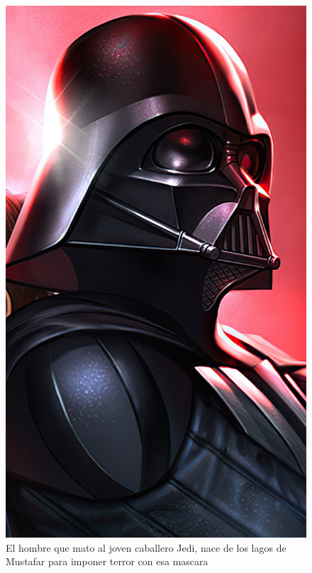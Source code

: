 \documentclass[11pt, a5paper]{article}
\begin{document}
\begin{figure}
\includegraphics[scale=0.07, angle=-18]{darth-vader-star-wars-6875.jpg}
\caption*{El hombre que mato al joven caballero Jedi, nace de los lagos de Mustafar para imponer terror con esa mascara}

\end{figure}
\end{document}

